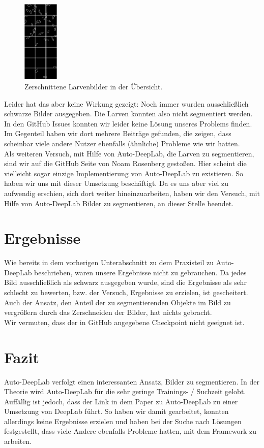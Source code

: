 \begin{figure}[H]
	\centering
	\includegraphics[width=0.15\textwidth]{Pictures/AutoDeepLab/ZerschnittBoxen-Beispiel.png}
	\caption{Zerschnittene Larvenbilder in der Übersicht.}
	\label{pic:zerschnitteneLarven}
\end{figure}
Leider hat das aber keine Wirkung gezeigt: Noch immer wurden ausschließlich schwarze Bilder ausgegeben. Die Larven konnten also nicht segmentiert werden.\\
In den GitHub Issues konnten wir leider keine Lösung unseres Problems finden. Im Gegenteil haben wir dort mehrere Beiträge gefunden, die zeigen, dass scheinbar viele andere Nutzer ebenfalls (ähnliche) Probleme wie wir hatten.\\
Als weiteren Versuch, mit Hilfe von Auto-DeepLab, die Larven zu segmentieren, sind wir auf die GitHub Seite von Noam Rosenberg \cite{deeplabRosenberg} gestoßen. Hier scheint die vielleicht sogar einzige Implementierung von Auto-DeepLab zu existieren. So haben wir uns mit dieser Umsetzung beschäftigt. Da es uns aber viel zu aufwendig erschien, sich dort weiter hineinzuarbeiten, haben wir den Versuch, mit Hilfe von Auto-DeepLab Bilder zu segmentieren, an dieser Stelle beendet.


\section{Ergebnisse}

Wie bereits in dem vorherigen Unterabschnitt zu dem Praxisteil zu Auto-DeepLab beschrieben, waren unsere Ergebnisse nicht zu gebrauchen. Da jedes Bild ausschließlich als schwarz ausgegeben wurde, sind die Ergebnisse als sehr schlecht zu bewerten, bzw. der Versuch, Ergebnisse zu erzielen, ist gescheitert. Auch der Ansatz, den Anteil der zu segmentierenden Objekte im Bild zu vergrößern durch das Zerschneiden der Bilder, hat nichts gebracht.\\
Wir vermuten, dass der in GitHub angegebene Checkpoint nicht geeignet ist.


\section{Fazit}

Auto-DeepLab verfolgt einen interessanten Ansatz, Bilder zu segmentieren. In der Theorie wird Auto-DeepLab für die sehr geringe Trainings- / Suchzeit gelobt. Auffällig ist jedoch, dass der Link in dem Paper zu Auto-DeepLab \cite{autodeeplabPaper} zu einer Umsetzung von DeepLab \cite{deeplabGithub} führt.  So haben wir damit gearbeitet, konnten allerdings keine Ergebnisse erzielen und haben bei der Suche nach Lösungen festgestellt, dass viele Andere ebenfalls Probleme hatten, mit dem Framework zu arbeiten.

